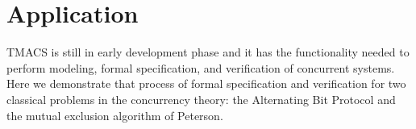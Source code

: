 \section{Application}
\label{sec:application}

TMACS is still in early development phase and it has the functionality needed to perform modeling, formal specification, and verification of concurrent systems. Here we demonstrate that process of formal specification and verification for two classical problems in the concurrency theory: the Alternating Bit Protocol and the mutual exclusion algorithm of Peterson.


